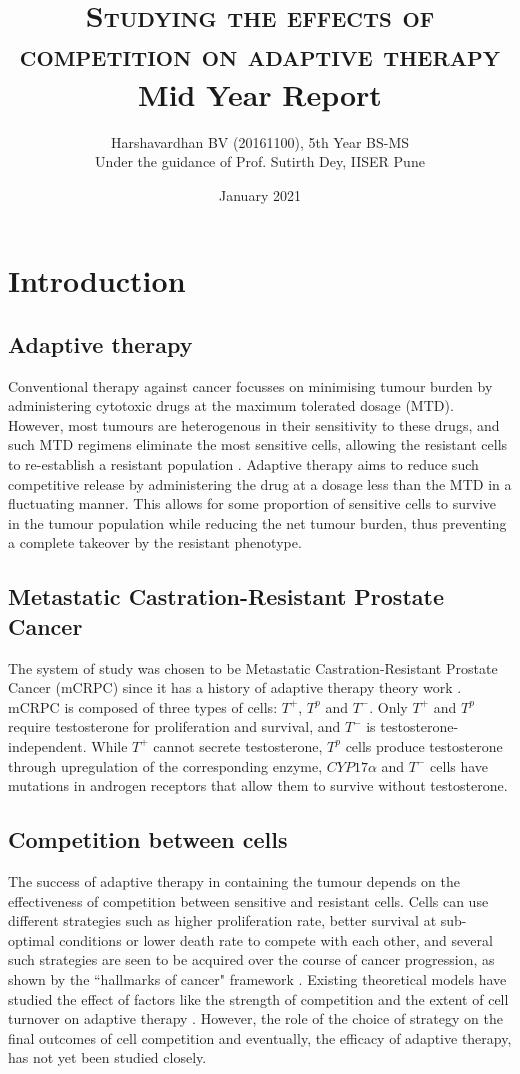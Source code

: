 \documentclass[11pt,a4paper]{article}
\title{\textsc{Studying the effects of competition on adaptive therapy}\\\Large{Mid Year Report}}
\author{Harshavardhan BV (20161100), 5th Year BS-MS\\
Under the guidance of Prof. Sutirth Dey, IISER Pune}
\date{January 2021}
\begin{document}
\maketitle

\section{Introduction}
\subsection{Adaptive therapy}
Conventional therapy against cancer focusses on minimising tumour burden by administering cytotoxic drugs at the maximum tolerated dosage (MTD). However, most tumours are heterogenous in their sensitivity to these drugs, and such MTD regimens eliminate the most sensitive cells, allowing the resistant cells to re-establish a resistant population \cite{Scott}. Adaptive therapy aims to reduce such competitive release by administering the drug at a dosage less than the MTD in a fluctuating manner. This allows for some proportion of sensitive cells to survive in the tumour population while reducing the net tumour burden, thus preventing a complete takeover by the resistant phenotype.

\subsection{Metastatic Castration-Resistant Prostate Cancer}
The system of study was chosen to be Metastatic Castration-Resistant Prostate Cancer (mCRPC) since it has a history of adaptive therapy theory work \cite{Cunningham}. mCRPC is composed of three types of cells: $T^+$, $T^p$ and $T^-$. Only $T^+$ and $T^p$ require testosterone for proliferation and survival, and $T^-$ is testosterone-independent. While $T^+$ cannot secrete testosterone, $T^p$ cells produce testosterone through upregulation of the corresponding enzyme, $CYP17\alpha$ and $T^-$ cells have mutations in androgen receptors that allow them to survive without testosterone.

\subsection{Competition between cells}
The success of adaptive therapy in containing the tumour depends on the effectiveness of competition between sensitive and resistant cells. Cells can use different strategies such as higher proliferation rate, better survival at sub-optimal conditions or lower death rate to compete with each other, and several such strategies are seen to be acquired over the course of cancer progression, as shown by the ``hallmarks of cancer" framework \cite{Hanahan}. Existing theoretical models have studied the effect of factors like the strength of competition and the extent of cell turnover on adaptive therapy \cite{Viossat,Strobl}. However, the role of the choice of strategy on the final outcomes of cell competition and eventually, the efficacy of adaptive therapy, has not yet been studied closely.
\end{document}
